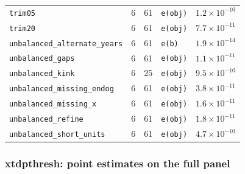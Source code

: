 \documentclass[
  10.5pt,
  a4paper,
]{article}
\begin{document}
\begin{longtable}{@{}p{3.6cm}rrp{4.9cm}r@{}}
\texttt{trim05} & 6 & 61 & \texttt{e(obj)} & $1.2\times10^{-10}$ \\
\texttt{trim20} & 6 & 61 & \texttt{e(obj)} & $7.7\times10^{-11}$ \\
\texttt{unbalanced\_\allowbreak{}alternate\_\allowbreak{}years} & 6 & 61 & \texttt{e(b)} & $1.9\times10^{-14}$ \\
\texttt{unbalanced\_\allowbreak{}gaps} & 6 & 61 & \texttt{e(obj)} & $1.1\times10^{-11}$ \\
\texttt{unbalanced\_\allowbreak{}kink} & 6 & 25 & \texttt{e(obj)} & $9.5\times10^{-10}$ \\
\texttt{unbalanced\_\allowbreak{}missing\_\allowbreak{}endog} & 6 & 61 & \texttt{e(obj)} & $3.8\times10^{-11}$ \\
\texttt{unbalanced\_\allowbreak{}missing\_\allowbreak{}x} & 6 & 61 & \texttt{e(obj)} & $1.6\times10^{-11}$ \\
\texttt{unbalanced\_\allowbreak{}refine} & 6 & 61 & \texttt{e(obj)} & $1.8\times10^{-11}$ \\
\texttt{unbalanced\_\allowbreak{}short\_\allowbreak{}units} & 6 & 61 & \texttt{e(obj)} & $4.7\times10^{-10}$ \\
\bottomrule
\end{longtable}

\subsubsection*{xtdpthresh: point estimates on the full panel}
\end{document}
